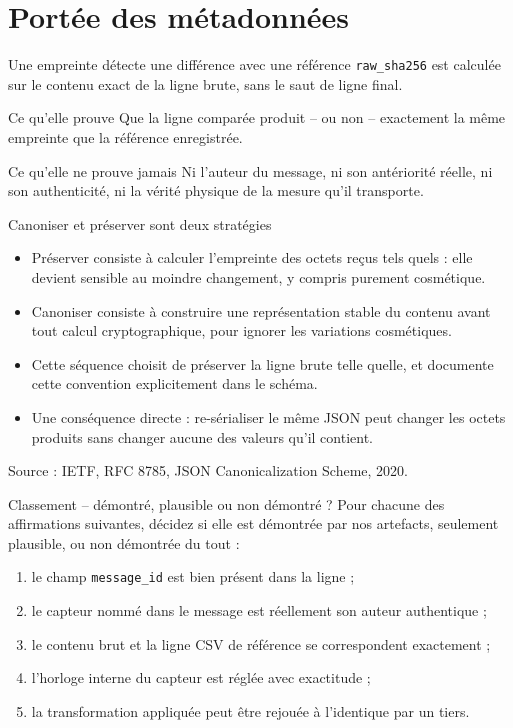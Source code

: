 \documentclass[aspectratio=169]{beamer}
\newcommand{\sourcefoot}[1]{\vfill\tiny\color{gray}Source : #1}
\begin{document}
\section{Portée des métadonnées}
\begin{frame}{Une empreinte détecte une différence avec une référence}
\texttt{raw\_sha256} est calculée sur le contenu exact de la ligne brute, sans le saut de ligne final.
\begin{block}{Ce qu'elle prouve}
Que la ligne comparée produit -- ou non -- exactement la même empreinte que la référence enregistrée.
\end{block}
\begin{alertblock}{Ce qu'elle ne prouve jamais}
Ni l'auteur du message, ni son antériorité réelle, ni son authenticité, ni la vérité physique de la mesure qu'il transporte.
\end{alertblock}
\end{frame}

\begin{frame}{Canoniser et préserver sont deux stratégies}
\begin{itemize}
\item Préserver consiste à calculer l'empreinte des octets reçus tels quels : elle devient sensible au moindre changement, y compris purement cosmétique.
\item Canoniser consiste à construire une représentation stable du contenu avant tout calcul cryptographique, pour ignorer les variations cosmétiques.
\item Cette séquence choisit de préserver la ligne brute telle quelle, et documente cette convention explicitement dans le schéma.
\item Une conséquence directe : re-sérialiser le même JSON peut changer les octets produits sans changer aucune des valeurs qu'il contient.
\end{itemize}
\sourcefoot{IETF, RFC 8785, JSON Canonicalization Scheme, 2020.}
\end{frame}

\begin{frame}{Classement -- démontré, plausible ou non démontré ?}
Pour chacune des affirmations suivantes, décidez si elle est démontrée par nos artefacts, seulement plausible, ou non démontrée du tout :
\begin{enumerate}
\item le champ \texttt{message\_id} est bien présent dans la ligne ;
\item le capteur nommé dans le message est réellement son auteur authentique ;
\item le contenu brut et la ligne CSV de référence se correspondent exactement ;
\item l'horloge interne du capteur est réglée avec exactitude ;
\item la transformation appliquée peut être rejouée à l'identique par un tiers.
\end{enumerate}
\end{frame}
\end{document}
